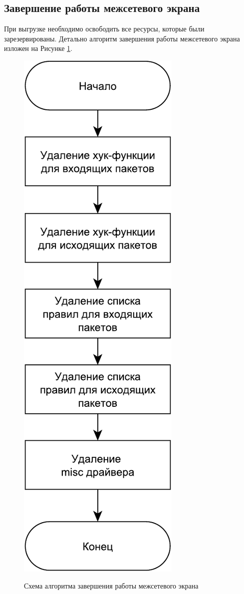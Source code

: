 \newpage

\subsection{Завершение работы межсетевого экрана}
При выгрузке необходимо освободить все ресурсы, которые были зарезервированы. Детально алгоритм завершения работы межсетевого экрана изложен на Рисунке \ref{fig4:image}.
\begin{figure}[h!]
	\begin{center}
		{\includegraphics[scale = 0.6]{img/exit.pdf}}
		\caption{Схема алгоритма завершения работы межсетевого экрана}
		\label{fig4:image}
	\end{center}
\end{figure}

